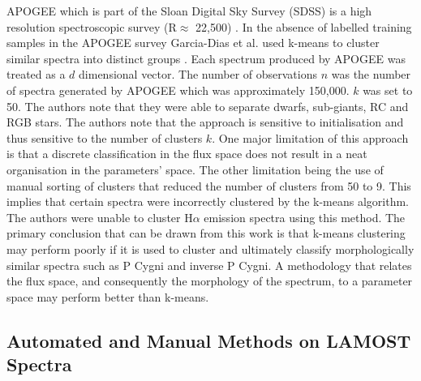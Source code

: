APOGEE which is part of the Sloan Digital Sky Survey (SDSS) is a high resolution spectroscopic survey (R$\approx$ 22,500) \cite{eisenstein2001spectroscopic,blanton2017sloan}. In the absence of labelled training samples in the APOGEE survey Garcia-Dias et al. used k-means to cluster similar spectra into distinct groups \cite{garcia2018machine}. Each spectrum produced by APOGEE was treated as a $d$ dimensional vector. The number of observations $n$ was the number of spectra generated by APOGEE which was approximately 150,000. $k$ was set to 50. The authors note that they were able to separate dwarfs, sub-giants, RC and RGB stars. The authors note that the approach is sensitive to initialisation and thus sensitive to the number of clusters $k$. One major limitation of this approach is that a discrete classification in the flux space does not result in a neat organisation in the parameters' space. The other limitation being the use of manual sorting of clusters that reduced the number of clusters from 50 to 9. This implies that certain spectra were incorrectly clustered by the k-means algorithm. The authors were unable to cluster H$\alpha$ emission spectra using this method. The primary conclusion that can be drawn from this work is that k-means clustering may perform poorly if it is used to cluster and ultimately classify morphologically similar spectra such as P Cygni and inverse P Cygni. A methodology that relates the flux space, and consequently the morphology of the spectrum, to a parameter space may perform better than k-means. 

\subsection{Automated and Manual Methods on LAMOST Spectra}

